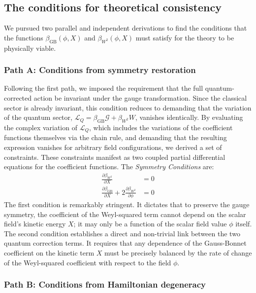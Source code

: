 \documentclass[twocolumn]{aastex631}
\begin{document}
\subsection{The conditions for theoretical consistency}

We pursued two parallel and independent derivations to find the conditions that the functions $\beta_{\text{GB}}(\phi, X)$ and $\beta_{W^2}(\phi, X)$ must satisfy for the theory to be physically viable.

\subsubsection{Path A: Conditions from symmetry restoration}

Following the first path, we imposed the requirement that the full quantum-corrected action be invariant under the gauge transformation. Since the classical sector is already invariant, this condition reduces to demanding that the variation of the quantum sector, $\mathcal{L}_Q = \beta_{\text{GB}}\mathcal{G} + \beta_{W^2}W$, vanishes identically. By evaluating the complex variation of $\mathcal{L}_Q$, which includes the variations of the coefficient functions themselves via the chain rule, and demanding that the resulting expression vanishes for arbitrary field configurations, we derived a set of constraints. These constraints manifest as two coupled partial differential equations for the coefficient functions. The \textit{Symmetry Conditions} are:
\begin{align}
    \frac{\partial\beta_{W^2}}{\partial X} &= 0 \label{eq:sym_cond1} \\
    \frac{\partial\beta_{\text{GB}}}{\partial X} + 2 \frac{\partial\beta_{W^2}}{\partial\phi} &= 0 \label{eq:sym_cond2}
\end{align}
The first condition is remarkably stringent. It dictates that to preserve the gauge symmetry, the coefficient of the Weyl-squared term cannot depend on the scalar field's kinetic energy $X$; it may only be a function of the scalar field value $\phi$ itself. The second condition establishes a direct and non-trivial link between the two quantum correction terms. It requires that any dependence of the Gauss-Bonnet coefficient on the kinetic term $X$ must be precisely balanced by the rate of change of the Weyl-squared coefficient with respect to the field $\phi$.

\subsubsection{Path B: Conditions from Hamiltonian degeneracy}
\end{document}
